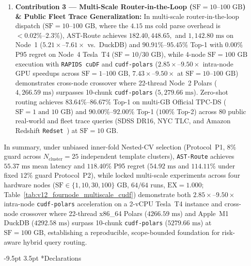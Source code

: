 \documentclass[10pt,a4paper]{article}
\makeatletter
\renewcommand\section{\@startsection{section}{1}{\z@}%
  {-9.5pt \@plus -2pt \@minus -1.5pt}%
  {3.5pt \@plus 1pt}%
  {\normalfont\large\bfseries}}
\makeatother
\begin{document}
\begin{enumerate}[leftmargin=1.5em,itemsep=1.5pt]
    \item \textbf{Contribution 3 --- Multi-Scale Router-in-the-Loop ($\text{SF}=10\text{--}100\text{ GB}$) \& Public Fleet Trace Generalization:} In multi-scale router-in-the-loop dispatch ($\text{SF}=10\text{--}100\text{ GB}$, where the $4.15\text{ ms}$ cold parse overhead is $<0.02\%\text{--}2.3\%$), AST-Route achieves $182.40, 448.65,$ and $1{,}142.80\text{ ms}$ on Node~1 ($5.21\times\text{--}7.61\times$ vs.\ DuckDB) and $90.91\%\text{--}95.45\%$ Top-1 with $0.00\%$ P95 regret on Node~4 Tesla~T4 ($\text{SF}=10/30\text{ GB}$), while 4-node $\text{SF}=100\text{ GB}$ execution with \texttt{RAPIDS cuDF} and \texttt{cudf-polars} ($2.85\times\text{--}9.50\times$ intra-node GPU speedups across $\text{SF}=1\text{--}100\text{ GB}$, $7.43\times\text{--}9.50\times$ at $\text{SF}=10\text{--}100\text{ GB}$) demonstrates cross-node crossover where 22-thread Node~2 Polars ($4{,}266.59\text{ ms}$) surpasses 10-chunk \texttt{cudf-polars} ($5{,}279.66\text{ ms}$). Zero-shot routing achieves $83.64\%\text{--}86.67\%$ Top-1 on multi-GB Official TPC-DS ($\text{SF}=1\text{ and }10\text{ GB}$) and $90.00\%\text{--}92.00\%$ Top-1 ($100\%$ Top-2) across $80$ public real-world and fleet trace queries (SDSS DR16, NYC TLC, and Amazon Redshift \texttt{Redset}~\cite{vanrenen2024redset}) at $\text{SF}=10\text{ GB}$.
\end{enumerate}


In summary, under unbiased inner-fold Nested-CV selection (Protocol~P1, $8\%$ guard across $N_{\text{cluster}}=25$ independent template clusters), \texttt{AST-Route} achieves $55.37\text{ ms}$ mean latency and $118.40\%$ P95 regret ($54.92\text{ ms}$ and $114.11\%$ under fixed $12\%$ guard Protocol~P2), while locked multi-scale experiments across four hardware nodes ($\text{SF}\in\{1,10,30,100\}\text{ GB}$, $64/64$ runs, $\text{EX}=1.000$; Table~\ref{tab:v12_fournode_multiscale_cudf}) demonstrate both $2.85\times\text{--}9.50\times$ intra-node \texttt{cudf-polars} acceleration on a 2-vCPU Tesla~T4 instance and cross-node crossover where 22-thread x86\_64 Polars ($4266.59\text{ ms}$) and Apple~M1 DuckDB ($4292.58\text{ ms}$) surpass 10-chunk \texttt{cudf-polars} ($5279.66\text{ ms}$) at $\text{SF}=100\text{ GB}$, establishing a reproducible, scope-bounded foundation for risk-aware hybrid query routing.

\section*{Declarations}
\enlargethispage{1.8\baselineskip}
\vspace{-5pt}
\end{document}
